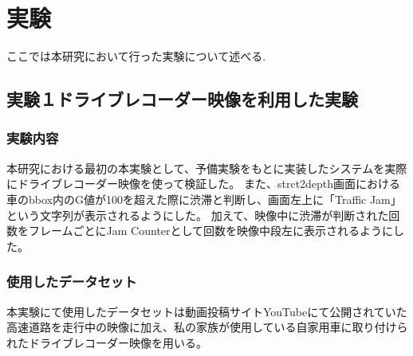 \chapter{実験}
ここでは本研究において行った実験について述べる.

\section{実験１ドライブレコーダー映像を利用した実験}
\subsection{実験内容}
本研究における最初の本実験として、予備実験をもとに実装したシステムを実際にドライブレコーダー映像を使って検証した。
また、strct2depth画面における車のbbox内のG値が100を超えた際に渋滞と判断し、画面左上に「Traffic Jam」という文字列が表示されるようにした。
加えて、映像中に渋滞が判断された回数をフレームごとにJam Counterとして回数を映像中段左に表示されるようにした。

\subsection{使用したデータセット}
本実験にて使用したデータセットは動画投稿サイトYouTubeにて公開されていた高速道路を走行中の映像に加え、私の家族が使用している自家用車に取り付けられたドライブレコーダー映像を用いる。

